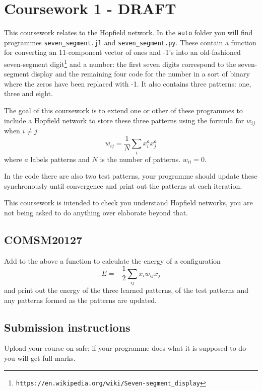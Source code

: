 \documentclass[12pt]{article}
\begin{document}
\section*{Coursework 1 - DRAFT}

This coursework relates to the Hopfield network. In the \texttt{auto}
folder you will find programmes \texttt{seven\_segment.jl} and
\texttt{seven\_segment.py}. These contain a function for converting an
11-component vector of ones and -1's into an old-fashioned
seven-segment digit\footnote{\texttt{https://en.wikipedia.org/wiki/Seven-segment\_display}} and a number: the first seven digits correspond to
the seven-segment display and the remaining four code for the number
in a sort of binary where the zeros have been replaced with -1. It
also contains three patterns: one, three and eight.

The goal of this coursework is to extend one or other of these
programmes to include a Hopfield network to store these three
patterns using the formula for $w_{ij}$ when $i\not=j$
\begin{equation}
w_{ij}=\frac{1}{N}\sum_i x_i^a x_j^a
\end{equation}
where $a$ labels patterns and $N$ is the number of
patterns. $w_{ii}=0$.

In the code there are also two test patterns, your programme should
update these synchronously until convergence and print out the
patterns at each iteration. 

This coursework is intended to check you understand Hopfield networks,
you are not being asked to do anything over elaborate beyond that.

\subsection*{COMSM20127}

Add to the above a function to calculate the energy of a configuration
\begin{equation}
E=-\frac{1}{2}\sum_{ij} x_i w_{ij} x_j
\end{equation}
and print out the energy of the three learned patterns, of the test
patterns and any patterns formed as the patterns are updated.

\subsection*{Submission instructions}

Upload your course on safe; if your programme does what it is supposed
to do you will get full marks.
\end{document}
